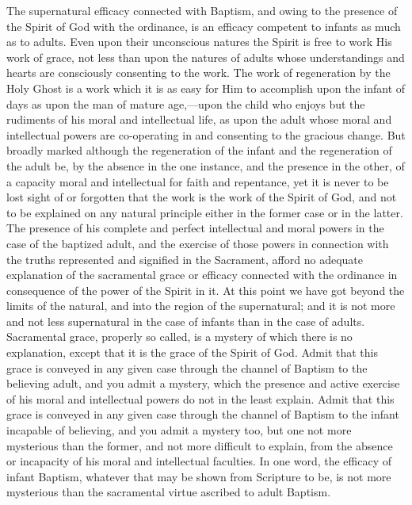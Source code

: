 \documentclass[english,]{book}
\begin{document}
The supernatural efficacy connected with Baptism, and owing to the presence of the Spirit of God with the ordinance, is an efficacy competent to infants as much as to adults. Even upon their unconscious natures the Spirit is free to work His work of grace, not less than upon the natures of adults whose understandings and hearts are consciously consenting to the work. The work of regeneration by the Holy Ghost is a work which it is as easy for Him to accomplish upon the infant of days as upon the man of mature age,---upon the child who enjoys but the rudiments of his moral and intellectual life, as upon the adult whose moral and intellectual powers are co-operating in and consenting to the gracious change. But broadly marked although the regeneration of the infant and the regeneration of the adult be, by the absence in the one instance, and the presence in the other, of a capacity moral and intellectual for faith and repentance, yet it is never to be lost sight of or forgotten that the work is the work of the Spirit of God, and not to be explained on any natural principle either in the former case or in the latter. The presence of his complete and perfect intellectual and moral powers in the case of the baptized adult, and the exercise of those powers in connection with the truths represented and signified in the Sacrament, afford no adequate explanation of the sacramental grace or efficacy connected with the ordinance in consequence of the power of the Spirit in it. At this point we have got beyond the limits of the natural, and into the region of the supernatural; and it is not more and not less supernatural in the case of infants than in the case of adults. Sacramental grace, properly so called, is a mystery of which there is no explanation, except that it is the grace of the Spirit of God. Admit that this grace is conveyed in any given case through the channel of Baptism to the believing adult, and you admit a mystery, which the presence and active exercise of his moral and intellectual powers do not in the least explain. Admit that this grace is conveyed in any given case through the channel of Baptism to the infant incapable of believing, and you admit a mystery too, but one not more mysterious than the former, and not more difficult to explain, from the absence or incapacity of his moral and intellectual faculties. In one word, the efficacy of infant Baptism, whatever that may be shown from Scripture to be, is not more mysterious than the sacramental virtue ascribed to adult Baptism.
\end{document}
